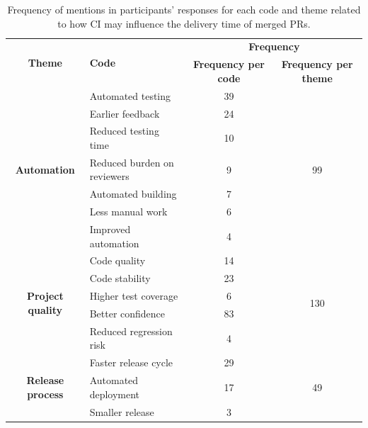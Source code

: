 \begin{table}
	\centering
	\caption{Frequency of mentions in participants' responses for each code and theme related to how CI may influence the delivery time of merged PRs.}
	\begin{tabular}{cp{10.75em}cc}
		\hline
		\multirow{2}[4]{*}{\textbf{Theme}} & \multirow{2}[4]{*}{\textbf{Code}} & \multicolumn{2}{c}{\textbf{Frequency}} \bigstrut\\
		\cline{3-4}          & \multicolumn{1}{c}{} & \multicolumn{1}{p{5.415em}}{\textbf{Frequency per code}} & \multicolumn{1}{p{5.585em}}{\textbf{Frequency per theme}} \bigstrut\\
		\hline
		\multirow{7}[14]{*}{\textbf{Automation}} & Automated testing & 39    & \multirow{7}[14]{*}{99} \bigstrut\\
		\cline{2-3}          & Earlier feedback & 24    &  \bigstrut\\
		\cline{2-3}          & Reduced testing time & 10    &  \bigstrut\\
		\cline{2-3}          & Reduced burden on reviewers & 9     &  \bigstrut\\
		\cline{2-3}          & Automated building & 7     &  \bigstrut\\
		\cline{2-3}          & Less manual work & 6     &  \bigstrut\\
		\cline{2-3}          & Improved automation & 4     &  \bigstrut\\
		\hline
		\multirow{5}[10]{*}{\textbf{Project quality}} & Code quality & 14    & \multirow{5}[10]{*}{130} \bigstrut\\
		\cline{2-3}          & Code stability & 23    &  \bigstrut\\
		\cline{2-3}          & Higher test coverage & 6     &  \bigstrut\\
		\cline{2-3}          & Better confidence & 83    &  \bigstrut\\
		\cline{2-3}          & Reduced regression risk & 4     &  \bigstrut\\
		\hline
		\multicolumn{1}{c}{\multirow{3}[6]{*}{\textbf{Release process}}} & Faster release cycle & 29    & \multirow{3}[6]{*}{49} \bigstrut\\
		\cline{2-3}          & Automated deployment & 17    &  \bigstrut\\
		\cline{2-3}          & Smaller release & 3     &  \bigstrut\\
		\hline
	\end{tabular}%
	\label{tab:frequency_citation_CI_factors_impact}%
\end{table}%

